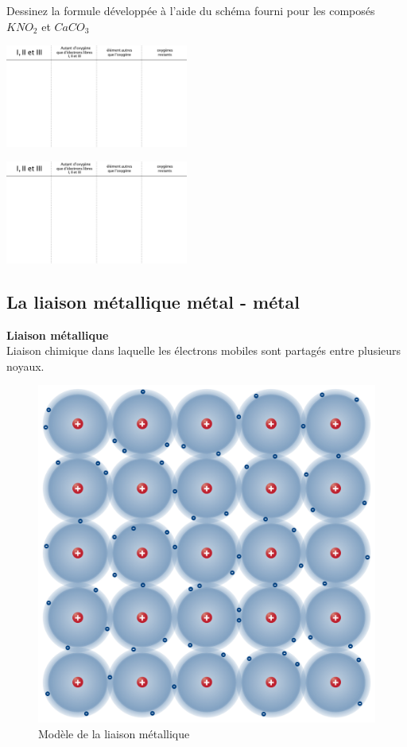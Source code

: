 \documentclass[
  11pt,
  a4paper,
  openany]{book}
\begin{document}
\begin{Exercise}

Dessinez la formule développée à l'aide du schéma fourni pour les composés \(KNO_2\) et \(CaCO_3\)

\begin{multicols}{2}
\includegraphics[width=0.45\textwidth,height=\textheight]{exe/formule-developpee.png}

\includegraphics[width=0.45\textwidth,height=\textheight]{exe/formule-developpee.png}

\end{multicols}

\end{Exercise}

\newpage

\subsection{La liaison métallique \textbar{} métal - métal}\label{la-liaison-muxe9tallique-muxe9tal---muxe9tal}

\begin{tcolorbox}
\textbf{Liaison métallique}\\
Liaison chimique dans laquelle les électrons mobiles sont partagés entre plusieurs noyaux.

\end{tcolorbox}

\begin{figure}

{\centering \includegraphics[width=0.4\linewidth]{images/metallic-bonding} 

}

\caption{Modèle de la liaison métallique}\label{fig:metallic-bonding}
\end{figure}
\end{document}
